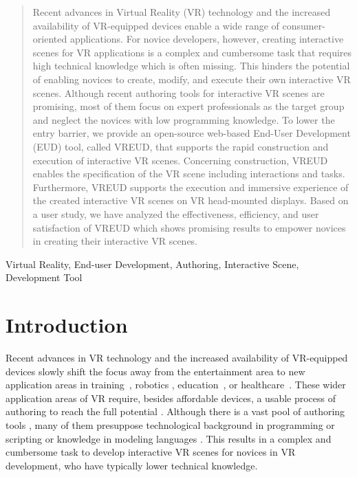 \documentclass[conference]{IEEEtran}
\begin{document}
\begin{abstract}
	Recent advances in Virtual Reality (VR) technology and the increased availability of VR-equipped devices enable a wide range of consumer-oriented applications. For novice developers, however, creating interactive scenes for VR applications is a complex and cumbersome task that requires high technical knowledge which is often missing. This hinders the potential of enabling novices to create, modify, and execute their own interactive VR scenes. Although recent authoring tools for interactive VR scenes are promising, most of them focus on expert professionals as the target group and neglect the novices with low programming knowledge. To lower the entry barrier, we provide an open-source web-based End-User Development (EUD) tool, called VREUD, that supports the rapid construction and execution of interactive VR scenes. Concerning construction, VREUD enables the specification of the VR scene including interactions and tasks. Furthermore, VREUD supports the execution and immersive experience of the created interactive VR scenes on VR head-mounted displays. Based on a user study, we have analyzed the effectiveness, efficiency, and user satisfaction of VREUD which shows promising results to empower novices in creating their interactive VR scenes. 
\end{abstract}

\begin{IEEEkeywords}
Virtual Reality, End-user Development, Authoring, Interactive Scene, Development Tool
\end{IEEEkeywords}

\section{Introduction}
Recent advances in \ac{VR} technology and the increased availability of VR-equipped devices slowly shift the focus away from the entertainment area to new application areas in training~\cite{DBLP:conf/vrst/YigitbasJSE20}, robotics \cite{DBLP:journals/corr/abs-2103-10804}, education~\cite{DBLP:conf/mc/YigitbasTE20}, or healthcare~\cite{DBLP:conf/mc/YigitbasHE19}. 
These wider application areas of \ac{VR} require, besides affordable devices, a usable process of authoring to reach the full potential \cite{PotentialVR}. Although there is a vast pool of authoring tools \cite{AuthoringGroups}, many of them presuppose technological background in programming or scripting \cite{UnityWebpage, UnrealWebpage, PolyVR} or knowledge in modeling languages \cite{SumerianWebpage, FlowMatic}. This results in a complex and cumbersome task to develop interactive \ac{VR} scenes for novices in \ac{VR} development, who have typically lower technical knowledge.
\end{document}
